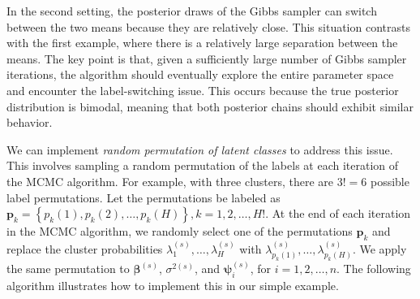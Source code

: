 In the second setting, the posterior draws of the Gibbs sampler can switch between the two means because they are relatively close. This situation contrasts with the first example, where there is a relatively large separation between the means. The key point is that, given a sufficiently large number of Gibbs sampler iterations, the algorithm should eventually explore the entire parameter space and encounter the label-switching issue. This occurs because the true posterior distribution is bimodal, meaning that both posterior chains should exhibit similar behavior. 

We can implement \textit{random permutation of latent classes} to address this issue. This involves sampling a random permutation of the labels at each iteration of the MCMC algorithm. For example, with three clusters, there are $3! = 6$ possible label permutations. Let the permutations be labeled as $\bm{p}_k=\left\{p_k(1),p_k(2),\dots,p_k(H)\right\}, k=1,2,\dots,H!$. At the end of each iteration in the MCMC algorithm, we randomly select one of the permutations $\bm{p}_k$ and replace the cluster probabilities $\lambda_1^{(s)},\dots,\lambda_H^{(s)}$ with $\lambda_{p_k(1)}^{(s)},\dots,\lambda_{p_k(H)}^{(s)}$. We apply the same permutation to $\bm{\beta}^{(s)}$, $\sigma^{2(s)}$, and $\bm{\psi}_{i}^{(s)}$, for $i=1,2,\dots,n$. The following algorithm illustrates how to implement this in our simple example.

